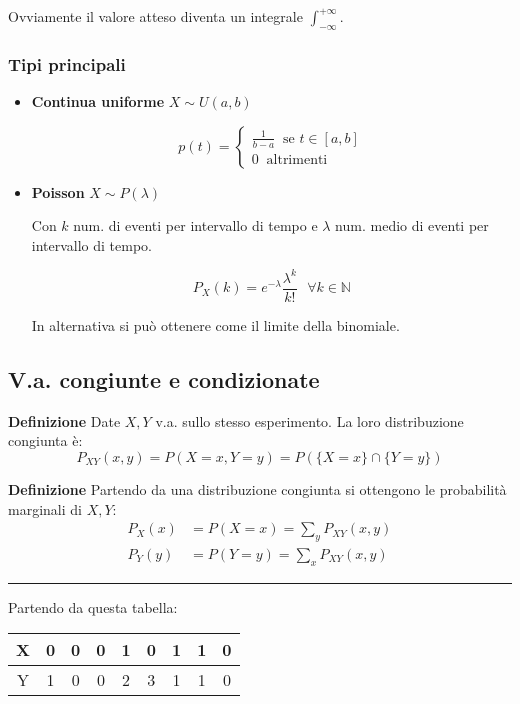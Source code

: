 \documentclass{article}
\begin{document}
\noindent Ovviamente il valore atteso diventa un integrale $\int_{-\infty}^{+\infty}$.\newline

\subsubsection{Tipi principali}
\begin{itemize}
    \item \textbf{Continua uniforme} $X\sim U(a,b)$
    
    \[p(t)=\begin{cases}
    \frac{1}{b-a}\ \text{ se } t\in[a,b]\\
    0\ \text{ altrimenti}
    \end{cases}\]

    \item \textbf{Poisson} $X\sim P(\lambda)$

        Con $k$ num. di eventi per intervallo di tempo e $\lambda$ num. medio di eventi per intervallo di tempo.

        $$P_X(k)=e^{-\lambda}\frac{\lambda^k}{k!}\ \ \ \forall k\in\mathbb{N}$$

        In alternativa si può ottenere come il limite della binomiale.\newline
    
\end{itemize}

\newpage

\subsection{V.a. congiunte e condizionate}

\textbf{Definizione} Date $X,Y$ v.a. sullo stesso esperimento. La loro distribuzione congiunta è:
$$P_{XY}(x,y)=P(X=x,Y=y)=P(\{X=x\}\cap\{Y=y\})$$\newline

\noindent\textbf{Definizione} Partendo da una distribuzione congiunta si ottengono le probabilità marginali di $X,Y$:
\begin{align}
\nonumber
    P_X(x) &= P(X=x)=\sum_yP_{XY}(x,y)\\
\nonumber
    P_Y(y) &= P(Y=y)=\sum_xP_{XY}(x,y)
\end{align}

\noindent\rule{\textwidth}{0.5pt}

Partendo da questa tabella:

\begin{table}[ht]
    \centering
    \begin{tabular}{c|cccccccc}
        X & 0 & 0 & 0 & 1 & 0 & 1 & 1 & 0\\
        \hline
        Y & 1 & 0 & 0 & 2 & 3 & 1 & 1 & 0\\
    \end{tabular}
    \label{tab:cong}
\end{table}
\end{document}
